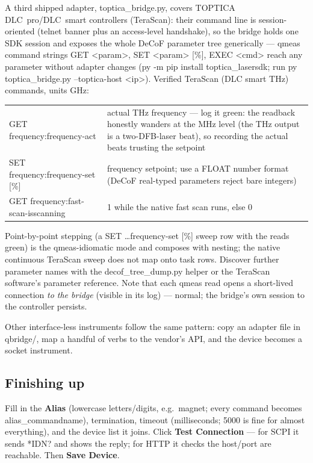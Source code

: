 \documentclass[11pt,a4paper]{article}
\newcommand{\code}[1]{{\ttfamily\color{qcode}#1}}
\begin{document}
A third shipped adapter, \code{toptica\_bridge.py}, covers TOPTICA DLC~pro/DLC~smart
controllers (TeraScan): their command line is session-oriented (telnet banner
plus an access-level handshake), so the bridge holds one SDK session and
exposes the whole DeCoF parameter tree generically --- qmeas command strings
\code{GET <param>}, \code{SET <param> [\%]}, \code{EXEC <cmd>} reach any
parameter without adapter changes (\code{py -m pip install toptica\_lasersdk}; run
\code{py toptica\_bridge.py --toptica-host <ip>}). Verified TeraScan (DLC
smart THz) commands, units GHz:

\begin{center}\small
\begin{tabular}{@{}p{4.6cm}p{9.2cm}@{}}
\toprule
\code{GET frequency:frequency-act} & actual THz frequency --- log it green:
  the readback honestly wanders at the MHz level (the THz output is a
  two-DFB-laser beat), so recording the actual beats trusting the setpoint \\
\code{SET frequency:frequency-set [\%]} & frequency setpoint; use a FLOAT
  number format (DeCoF real-typed parameters reject bare integers) \\
\code{GET frequency:fast-scan-isscanning} & 1 while the native fast scan
  runs, else 0 \\
\bottomrule
\end{tabular}
\end{center}

Point-by-point stepping (a \code{SET \ldots frequency-set [\%]} sweep row
with the reads green) is the qmeas-idiomatic mode and composes with nesting;
the native continuous TeraScan sweep does not map onto task rows. Discover
further parameter names with the \code{decof\_tree\_dump.py} helper or the
TeraScan software's parameter reference. Note that each qmeas read opens a
short-lived connection \emph{to the bridge} (visible in its log) --- normal;
the bridge's own session to the controller persists.

Other interface-less instruments follow the same pattern: copy an adapter
file in \code{qbridge/}, map a handful of verbs to the vendor's API, and the
device becomes a socket instrument.

\subsection{Finishing up}

Fill in the \textbf{Alias} (lowercase letters/digits, e.g.\ \code{magnet};
every command becomes \code{alias\_\allowbreak commandname}), termination, timeout
(milliseconds; 5000 is fine for almost everything), and the device list it
joins. Click \textbf{Test Connection} --- for SCPI it sends \code{*IDN?} and
shows the reply; for HTTP it checks the host/port are reachable. Then
\textbf{Save Device}.
\end{document}
